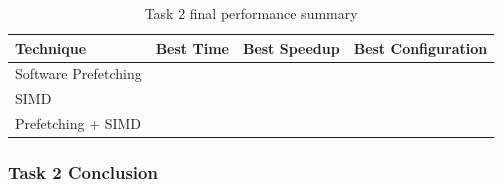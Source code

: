 \begin{table}[H]
\centering
\caption{Task 2 final performance summary}
\begin{tabular}{lccc}
\toprule
Technique & Best Time & Best Speedup & Best Configuration \\
\midrule
Software Prefetching & \TODO{...} & \TODO{...} & \TODO{...} \\
SIMD & \TODO{...} & \TODO{...} & \TODO{...} \\
Prefetching + SIMD & \TODO{...} & \TODO{...} & \TODO{...} \\
\bottomrule
\end{tabular}
\end{table}

\subsubsection{Task 2 Conclusion}

